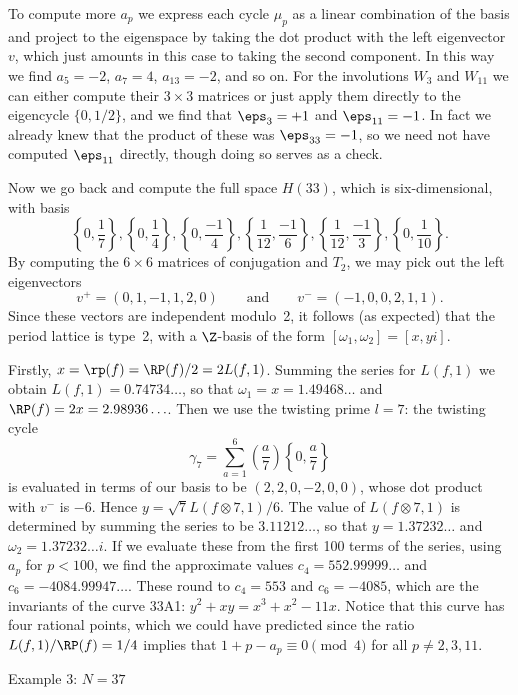 To compute more $a_p$ we express each cycle $\mu_p$ as a linear
combination of the basis and project to the eigenspace by taking the
dot product with the left eigenvector $v$, which just amounts in this
case to taking the second component.  In this way we find $a_5=-2$,
$a_7=4$, $a_{13}=-2$, and so on.  For the involutions $W_3$ and
$W_{11}$ we can either compute their $3\times 3$ matrices or just
apply them directly to the eigencycle $\{0,1/2\}$, and we find that
$\eps_3=+1$ and $\eps_{11}=-1$.  In fact we already knew that the
product of these was $\eps_{33}=-1$, so we need not have computed
$\eps_{11}$ directly, though doing so serves as a check.

Now we go back and compute the full space $H(33)$, which is 
six-dimensional, with basis
$$
  \left\{0,\frac{1}{7}\right\},
  \left\{0,\frac{1}{4}\right\},
  \left\{0,\frac{-1}{4}\right\},
  \left\{\frac{1}{12},\frac{-1}{6}\right\},
  \left\{\frac{1}{12},\frac{-1}{3}\right\},
  \left\{0,\frac{1}{10}\right\}.
$$
By computing the $6\times6$ matrices of conjugation and $T_2$, we may 
pick out the left eigenvectors
$$
  v^+=(0,1,-1,1,2,0) \qquad\text{and}\qquad
  v^-=(-1,0,0,2,1,1).
$$
Since these vectors are independent modulo~2, it follows (as expected)
that the period lattice is type~2, with a $\Z$-basis of the form
$[\omega_1,\omega_2] = [x,yi]$.

Firstly, $x=\rp(f)=\RP(f)/2=2L(f,1)$. Summing the series for $L(f,1)$ we
obtain $L(f,1)=0.74734\ldots$, so that $\omega_1=x=1.49468\ldots$
and $\RP(f)=2x=2.98936\ldots$.  Then we use the twisting prime $l=7$:
the twisting cycle
$$
   \gamma_7 = \sum_{a=1}^{6}\left(\frac{a}{7}\right)\left\{0,\frac{a}{7}\right\}
$$
is evaluated in terms of our basis to be $(2,2,0,-2,0,0)$, whose dot product
with $v^-$ is $-6$.  Hence $y=\sqrt{7}L(f\otimes7,1)/6$.  The value of 
$L(f\otimes7,1)$ is determined by summing the series to be $3.11212\ldots$,
so that $y=1.37232\ldots$ and $\omega_2=1.37232\ldots i$.  If we evaluate
these from the first 100 terms of the series, using $a_p$ for $p<100$,
we find the approximate values $c_4=552.99999\ldots$ and 
$c_6=-4084.99947\ldots$.  These round to $c_4=553$ and $c_6=-4085$, which 
are the invariants of the curve 33A1: $y^2+xy=x^3+x^2-11x$.  Notice that
this curve has four rational points, which we could have predicted since
the ratio $L(f,1)/\RP(f)=1/4$ implies that $1+p-a_p\equiv0\pmod4$ for all
$p\not=2,3,11$.



\head Example 3: $N=37$ \endhead

